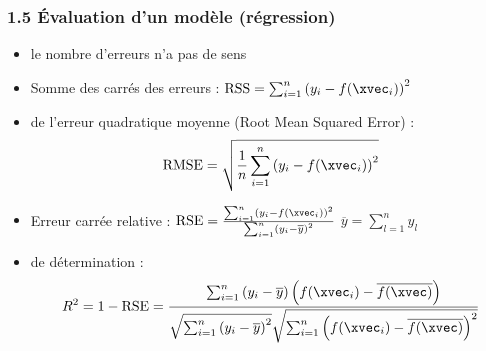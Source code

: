 \begin{frame}
  \frametitle{1.5 Évaluation d'un modèle (régression)}
  \begin{itemize}
  \item {} le nombre d'erreurs n'a pas de sens
    \pause
  \item Somme des carrés des erreurs : $\text{RSS} = \sum_{i=1}^n \left(y_i - f(\xvec_i) \right)^2$
  \item {} de l'erreur quadratique moyenne \textcolor{gray!70}{(Root Mean Squared Error)} : 
    \[\text{RMSE} = \sqrt{\frac1n \sum_{i=1}^n \left(y_i - f(\xvec_i) \right)^2}\]
  \item Erreur carrée relative : $\text{RSE} = \frac{\sum_{i=1}^n \left(y_i - f(\xvec_i) \right)^2}{\sum_{i=1}^n \left(y_i - \overline{y} \right)^2}$ \hspace{1em} $\overline{y} = \sum_{l=1}^n y_l$
  \item {} de détermination :
    \[
      R^2 = 1 - \text{RSE} = \frac{\sum_{i=1}^n \left( y_i - \overline{y} \right) \left( f(\xvec_i) - \overline{f(\xvec)} \right) }{\sqrt{\sum_{i=1}^n \left(y_i - \overline{y} \right)^2} \sqrt{\sum_{i=1}^n \left(f(\xvec_i) - \overline{f(\xvec)} \right)^2}}
    \]
  \end{itemize}
\end{frame}

